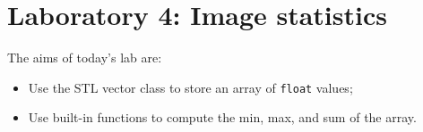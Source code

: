 \documentclass[english,a4paper,12pt,oneside]{article}
\begin{document}

\section*{Laboratory 4: Image statistics}

%
%
%
%    
%    

The aims of today's lab are:
\begin{itemize}
	\item Use the STL vector class to store an array of \verb+float+ values;
	\item Use built-in functions to compute the min, max, and sum of the array.
\end{itemize}
\end{document}
